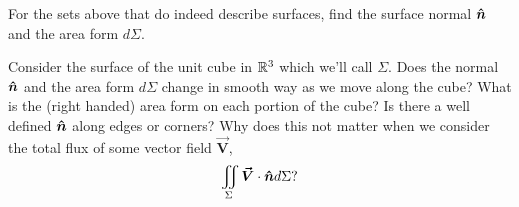 \documentclass[12pt]{article} %
\newcommand{\vecfieldV}{\boldsymbol{\vec{V}}}
\begin{document}
\begin{problem}
    For the sets above that do indeed describe surfaces, find the surface normal $\boldsymbol{\hat{n}}$ and the area form $d\Sigma$.
\end{problem}

\begin{problem}
    Consider the surface of the unit cube in $\mathbb{R}^3$ which we'll call $\Sigma$.  Does the normal $\boldsymbol{\hat{n}}$ and the area form $d\Sigma$ change in smooth way as we move along the cube?  What is the (right handed) area form on each portion of the cube? Is there a well defined $\boldsymbol{\hat{n}}$ along edges or corners? Why does this not matter when we consider the total flux of some vector field $\vecfieldV$,
    \[
        \iint_\Sigma \vecfieldV \cdot \unitvec d\Sigma?
    \]
\end{problem}
\end{document}
